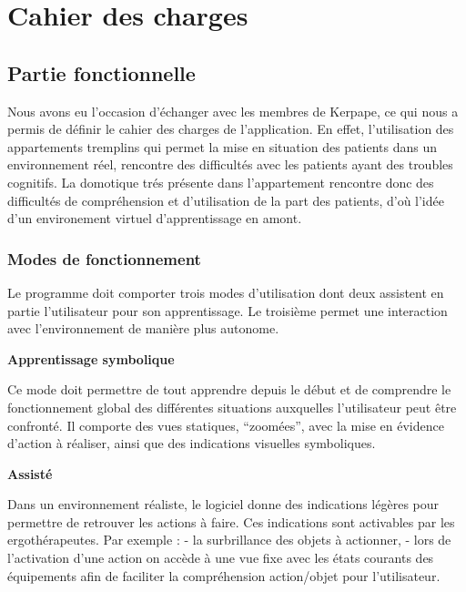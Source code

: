 
\section{Cahier des charges}
\subsection{Partie fonctionnelle}
  
Nous avons eu l’occasion d’échanger avec les membres de Kerpape, ce qui nous a permis de définir le cahier des charges de l’application.\newline
En effet, l'utilisation des appartements tremplins qui permet la mise en situation des patients dans un environnement réel, rencontre des difficultés avec les patients ayant des troubles cognitifs. La domotique trés présente dans l'appartement rencontre donc des difficultés de compréhension et d’utilisation de la part des patients, d'où l'idée d'un environement virtuel d'apprentissage en amont.

\subsubsection{Modes de fonctionnement}

Le programme doit comporter trois modes d’utilisation dont deux assistent en partie l’utilisateur pour son apprentissage. Le troisième permet une interaction avec l'environnement de manière plus autonome.
\newline 

\textbf{Apprentissage symbolique}
\newline 

Ce mode doit permettre de tout apprendre depuis le début et de comprendre le fonctionnement global des différentes situations auxquelles l'utilisateur peut être confronté. Il comporte des vues statiques, “zoomées”, avec la mise en évidence d’action à réaliser, ainsi que des indications visuelles symboliques.
\newline 

\textbf{Assisté}
\newline 

Dans un environnement réaliste, le logiciel donne des indications légères pour permettre de retrouver les actions à faire. Ces indications sont activables par les ergothérapeutes. \newline 
Par exemple :\newline 
- la surbrillance des objets à actionner,\newline 
- lors de l'activation d'une action on accède à une vue fixe avec les états courants des équipements afin de faciliter la compréhension action/objet pour l'utilisateur.
\newline 

